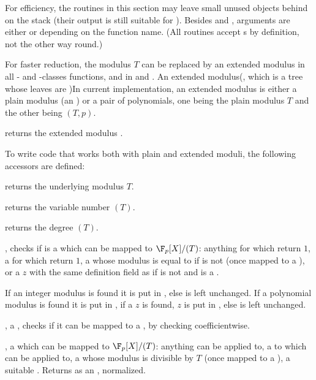 For efficiency, the routines in this section may leave small unused objects
behind on the stack (their output is still suitable for ).
Besides  and , arguments are either  or 
depending on the function name. (All  routines accept s by
definition, not the other way round.)


For faster reduction, the modulus $T$ can be replaced by an extended modulus
in all - and -classes functions, and in  and
. An extended modulus(, which is a tree whose leaves are )In
current implementation, an extended modulus is either a plain modulus (an
) or a pair of polynomials, one being the plain modulus $T$ and the
other being $(T,p)$.

 returns the extended modulus .

To write code that works both with plain and extended moduli, the following
accessors are defined:

 returns the underlying modulus $T$.

 returns the variable number $(T)$.

 returns the degree $(T)$.


, checks if  is a 
which can be mapped to $\F_p[X]/(T)$: anything for which  return
$1$, a  for which  return $1$, a 
whose modulus is equal to  if  is not  (once mapped
to a ), or a  $z$ with the same definition field as 
if  is not  and is a .

If an integer modulus is found it is put in , else  is left
unchanged. If a polynomial modulus is found it is put in ,
if a  $z$ is found, $z$ is put in , else
 is left unchanged.

,  a ,
checks if it can be mapped to a , by checking 
coefficientwise.

,  a  which can be
mapped to $\F_p[X]/(T)$: anything  can be applied to,
a  to which  can be applied to, a 
whose modulus is divisible by $T$ (once mapped to a ), a suitable
. Returns  as an , normalized.

